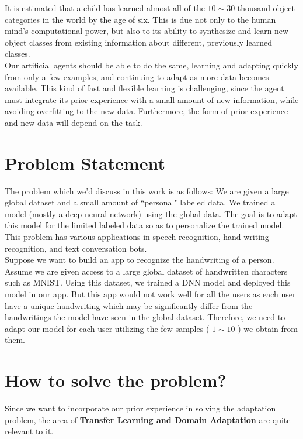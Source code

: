 It is estimated that a child has learned almost all of the $10\sim30$ thousand object categories in the world by the age of six. This is due not only to the human mind's computational power, but also to its ability to synthesize and learn new object classes from existing information about different, previously learned classes.\\

Our artificial agents should be able to do the same, learning and adapting quickly from only a few examples, and continuing to adapt as more data becomes available. This kind of fast and flexible learning is challenging, since the agent must integrate its prior experience with a small amount of new information, while avoiding overfitting to the new data. Furthermore, the form of prior experience and new data will depend on the task.

\section{Problem Statement}
The problem which we'd discuss in this work is as follows:\newline
We are given a large global dataset and a small amount of “personal" labeled data.
We trained a model (mostly a deep neural network) using the global data. The goal is to adapt this model for the limited labeled data so as to personalize the trained model. 
This problem has various applications in speech recognition, hand writing recognition, and text conversation bots.\\

Suppose we want to build an app to recognize the handwriting of a person. Assume we are given access to a large global dataset of handwritten characters such as MNIST\cite{lecun-mnisthandwrittendigit-2010}. Using this dataset, we trained a DNN model and deployed this model in our app. But this app would not work well for all the users as each user have a unique handwriting which may be significantly differ from the  handwritings the model have seen in the global dataset. Therefore, we need to adapt our model for each user utilizing the few samples ( $1\sim10$ ) we obtain from them.

\section{How to solve the problem?}
Since we want to incorporate our prior experience in solving the adaptation problem, the area of \textbf{Transfer Learning and Domain Adaptation} are quite relevant to it.\\ 

